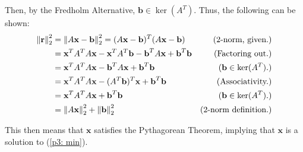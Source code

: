 \begin{solution}
\begin{itemize}
\begin{itemize}
            Then, by the Fredholm Alternative, $\textbf{b} \in \ker(A^T)$. Thus, the following can be shown:
            \alignbreak
            \begin{align}
                \norm{\textbf{r}}_2^2 &= \norm{A\textbf{x} - \textbf{b}}_2^2 = (A\textbf{x} - \textbf{b})^T(A\textbf{x} - \textbf{b}) &\text{(2-norm, given.)}\nonumber\\
                &= \textbf{x}^TA^TA\textbf{x} - \textbf{x}^TA^T\textbf{b} - \textbf{b}^TA\textbf{x} + \textbf{b}^T\textbf{b} &\text{(Factoring out.)}\nonumber\\
                &= \textbf{x}^TA^TA\textbf{x}  - \textbf{b}^TA\textbf{x} + \textbf{b}^T\textbf{b} &(\textbf{b} \in \ker(A^T).)\nonumber\\
                &= \textbf{x}^TA^TA\textbf{x}  - (A^T\textbf{b})^T\textbf{x} + \textbf{b}^T\textbf{b} &\text{(Associativity.)}\nonumber\\
                &= \textbf{x}^TA^TA\textbf{x} + \textbf{b}^T\textbf{b} &(\textbf{b} \in \ker(A^T).)\nonumber\\
                &= \norm{A\textbf{x}}_2^2 + \norm{\textbf{b}}_2^2 &\text{(2-norm definition.)}\nonumber
            \end{align}
            \alignbreak

            This then means that $\textbf{x}$ satisfies the Pythagorean Theorem, implying that $\textbf{x}$ is a solution to (\ref{p3: min}). 
        \end{itemize}
    \end{itemize}
\end{solution}

\newpage
